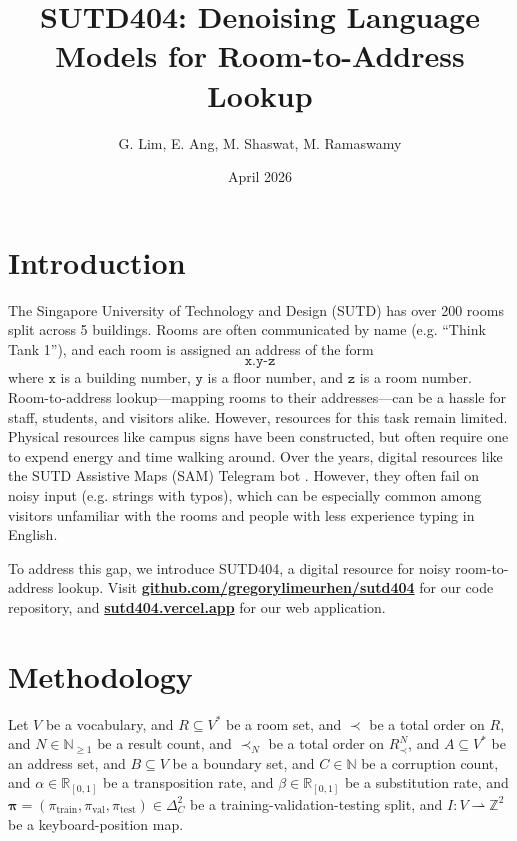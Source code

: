 \documentclass{article}
\title{SUTD404: Denoising Language Models for Room-to-Address Lookup}
\author{
	G. Lim,
	E. Ang,
	M. Shaswat,
	M. Ramaswamy
}
\date{April 2026}
\theoremstyle{definition}
\let\oldhref\href
\renewcommand{\href}[2]{\oldhref{#1}{\textbf{#2}}}
\newcommand{\N}{\mathbb{N}}
\newcommand{\R}{\mathbb{R}}
\newcommand{\Z}{\mathbb{Z}}
\begin{document}
\maketitle

\section{Introduction}

The Singapore University of Technology and Design (SUTD) has over 200 rooms split across 5 buildings.
Rooms are often communicated by name (e.g. ``Think Tank 1''),
and each room is assigned an address of the form
$$\texttt{x.y-z}$$
where $\texttt{x}$ is a building number,
$\texttt{y}$ is a floor number,
and $\texttt{z}$ is a room number.
Room-to-address lookup---mapping rooms to their addresses---can be a hassle for staff, students, and visitors alike.
However, resources for this task remain limited.
Physical resources like campus signs have been constructed,
but often require one to expend energy and time walking around.
Over the years,
digital resources like
the SUTD Assistive Maps (SAM) Telegram bot
\citep{sam}.
However, they often fail on noisy input (e.g. strings with typos),
which can be especially common among
visitors unfamiliar with the rooms
and people with less experience typing in English.

To address this gap,
we introduce SUTD404,
a digital resource for noisy room-to-address lookup.
Visit
\href{https://github.com/gregorylimeurhen/sutd404}{github.com/gregorylimeurhen/sutd404}
for our code repository, and
\href{https://sutd404.vercel.app}{sutd404.vercel.app}
for our web application.

\clearpage

\section{Methodology}


Let $V$ be a vocabulary,
and $R\subseteq V^{*}$ be a room set,
and $\prec$ be a total order on $R$,
and $N\in\N_{\geq 1}$ be a result count,
and $\prec_{N}$ be a total order on $R_{\prec}^{N}$,
and $A\subseteq V^{*}$ be an address set,
and $B\subseteq V$ be a boundary set,
and $C\in\N$ be a corruption count,
and $\alpha\in\R_{[0,1]}$ be a transposition rate,
and $\beta\in\R_{[0,1]}$ be a substitution rate,
and $\bm{\pi}=(\pi_\mathrm{train},\pi_\mathrm{val},\pi_\mathrm{test})\in\Delta_{C}^{2}$ be a training-validation-testing split,
and $I:V\rightharpoonup\Z^{2}$ be a keyboard-position map.
\end{document}
